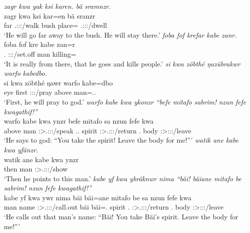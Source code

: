 \begin{exe}
	\emph{zagr kwa yak ksi karen. bä sramnzr.}\\
	\gll zagr kwa  ksi kar=en bä sranzr\\
	far \Fut{} \Tsg.\Masc:\Sbj:\Nonpast:\Ipfv/walk bush place=\Loc{} \Med{} \Tsg.\Masc:\Sbj:\Irr:\Ipfv/dwell\\
	\trans `He will go far away to the bush. He will stay there.'
	\emph{foba fof krefar kabe zanr.}\\
	\gll foba fof kre kabe zan=r\\
	\Dist.\Abl{} \Emph{} \Stsg:\Sbj:\Irr:\Pfv/set.off man killing=\Purp\\
	\trans `It is really from there, that he goes and kills people.'
	\emph{si kwa zöbthé ŋazübrakwr warfo kabedbo.}\\
	\gll si kwa zöbthé ŋawr warfo kabe=dbo\\
	eye \Fut{} first \Stsg:\Sbj:\Nonpast:\Ipfv/pray above man=\All.\Anim.\Sg\\
	\trans `First, he will pray to god.'
	\emph{warfo kabe kwa ykonzr ``befe mitafo sabrim! nzun fefe kwagathif!''}\\
	\gll warfo kabe kwa ynzr befe mitafo sa nzun fefe kwa\\
	above man \Fut{} \Stsg:\Sbj>\Tsg.\Masc:\Obj:\Nonpast:\Ipfv/speak \Ssg.\Erg.\Emph{} spirit \Stsg:\Sbj>\Tsg.\Masc:\Io:\Imp:\Pfv/return \Fsg.\Dat{} body \Stsg:\Sbj>\Fsg:\Io:\Imp:\Pfv/leave\\
	\trans `He says to god: ``You take the spirit! Leave the body for me!'''
	\emph{watik ane kabe kwa yfänzr.}\\
	\gll watik ane kabe kwa ynzr\\
	then \Dem{} man \Fut{} \Stsg:\Sbj>\Tsg.\Masc:\Obj:\Nonpast:\Ipfv/show\\
	\trans `Then he points to this man.'
	\emph{kabe yf kwa ybräknwr nima ``bäi! bäiane mitafo be sabrim! nzun fefe kwagathif!''}\\
	\gll kabe yf kwa ywr nima bäi bäi=ane mitafo be sa nzun fefe kwa\\
	man name \Fut{} \Stsg:\Sbj>\Tsg.\Masc:\Obj:\Nonpast:\Ipfv/call.out \Quot{} bäi bäi=\Poss.\Sg{} spirit \Ssg.\Erg{} \Stsg:\Sbj>\Tsg.\Masc:\Io:\Imp:\Pfv/return \Fsg.\Dat{} body \Stsg:\Sbj>\Fsg:\Io:\Imp:\Pfv/leave\\
	\trans `He calls out that man's name: ``Bäi! You take Bäi's spirit. Leave the body for me!'''

\end{exe}
